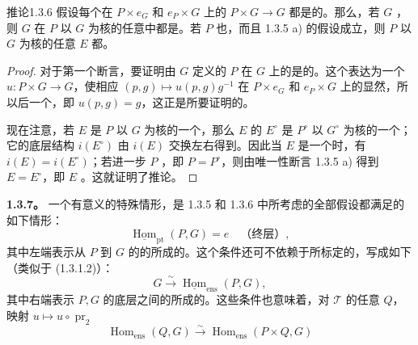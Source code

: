 \begin{SGAresult}{推论}{1.3.6}
假设每个在 $P\times e_G$ 和 $e_P\times G$ 上的 $P\times G\to G$ 都是的。那么，若 $G$ ，则 $G$ 在 $P$ 以 $G$ 为核的任意中都是。若 $P$ 也，而且 1.3.5 a) 的假设成立，则 $P$ 以 $G$ 为核的任意 $E$ 都。
\end{SGAresult}
\begin{proof}
对于第一个断言，要证明由 $G$ 定义的 $P$ 在 $G$ 上的是的。这个表达为一个 $u:P\times G\to G$，使相应 $(p,g)\mapsto u(p,g)g^{-1}$ 在 $P\times e_G$ 和 $e_P\times G$ 上的显然，所以后一个，即 $u(p,g)=g$，这正是所要证明的。

现在注意，若 $E$ 是 $P$ 以 $G$ 为核的一个，那么 $E$ 的 $E^\circ$ 是 $P^\circ$ 以 $G^\circ$ 为核的一个；它的底层结构 $i(E^\circ)$ 由 $i(E)$ 交换左右得到。因此当 $E$ 是一个时，有 $i(E)=i(E^\circ)$；若进一步 $P$ ，即 $P=P^\circ$，则由唯一性断言 1.3.5 a) 得到 $E=E^\circ$，即 $E$ 。这就证明了推论。
\end{proof}
\textbf{1.3.7。} 一个有意义的特殊情形，是 1.3.5 和 1.3.6 中所考虑的全部假设都满足的如下情形：
\[
\underline{\operatorname{Hom}}_{\mathrm{pt}}(P,G)=e\quad\text{（终层）},
\tag{1.3.7.1}
\]
其中左端表示从 $P$ 到 $G$ 的的所成的。这个条件还可不依赖于所标定的，写成如下（类似于 (1.3.1.2)）：
\[
G\xrightarrow{\sim}\underline{\operatorname{Hom}}_{\mathrm{ens}}(P,G),
\tag{1.3.7.2}
\]
其中右端表示 $P,G$ 的底层之间的所成的。这些条件也意味着，对 $\mathcal T$ 的任意 $Q$，映射 $u\mapsto u\circ\operatorname{pr}_2$
\[
\operatorname{Hom}_{\mathrm{ens}}(Q,G)\xrightarrow{\sim}
\operatorname{Hom}_{\mathrm{ens}}(P\times Q,G)
\tag{1.3.7.3}
\]
